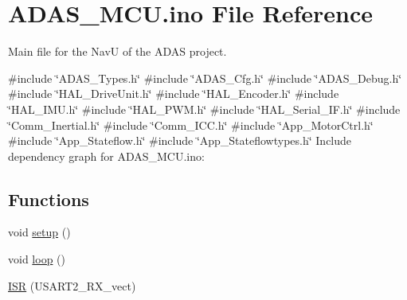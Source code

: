 \hypertarget{_a_d_a_s___m_c_u_8ino}{}\section{A\+D\+A\+S\+\_\+\+M\+C\+U.\+ino File Reference}
\label{_a_d_a_s___m_c_u_8ino}


Main file for the NavU of the A\+D\+AS project.  


{\ttfamily \#include \char`\"{}A\+D\+A\+S\+\_\+\+Types.\+h\char`\"{}}\newline
{\ttfamily \#include \char`\"{}A\+D\+A\+S\+\_\+\+Cfg.\+h\char`\"{}}\newline
{\ttfamily \#include \char`\"{}A\+D\+A\+S\+\_\+\+Debug.\+h\char`\"{}}\newline
{\ttfamily \#include \char`\"{}H\+A\+L\+\_\+\+Drive\+Unit.\+h\char`\"{}}\newline
{\ttfamily \#include \char`\"{}H\+A\+L\+\_\+\+Encoder.\+h\char`\"{}}\newline
{\ttfamily \#include \char`\"{}H\+A\+L\+\_\+\+I\+M\+U.\+h\char`\"{}}\newline
{\ttfamily \#include \char`\"{}H\+A\+L\+\_\+\+P\+W\+M.\+h\char`\"{}}\newline
{\ttfamily \#include \char`\"{}H\+A\+L\+\_\+\+Serial\+\_\+\+I\+F.\+h\char`\"{}}\newline
{\ttfamily \#include \char`\"{}Comm\+\_\+\+Inertial.\+h\char`\"{}}\newline
{\ttfamily \#include \char`\"{}Comm\+\_\+\+I\+C\+C.\+h\char`\"{}}\newline
{\ttfamily \#include \char`\"{}App\+\_\+\+Motor\+Ctrl.\+h\char`\"{}}\newline
{\ttfamily \#include \char`\"{}App\+\_\+\+Stateflow.\+h\char`\"{}}\newline
{\ttfamily \#include \char`\"{}App\+\_\+\+Stateflowtypes.\+h\char`\"{}}\newline
Include dependency graph for A\+D\+A\+S\+\_\+\+M\+C\+U.\+ino\+:
\subsection*{Functions}
\begin{DoxyCompactItemize}
\item 
void \mbox{\hyperlink{_a_d_a_s___m_c_u_8ino_a4fc01d736fe50cf5b977f755b675f11d}{setup}} ()
\item 
void \mbox{\hyperlink{_a_d_a_s___m_c_u_8ino_afe461d27b9c48d5921c00d521181f12f}{loop}} ()
\item 
\mbox{\hyperlink{_a_d_a_s___m_c_u_8ino_a63a86aad9ba2e355fe6380da553f554e}{I\+SR}} (U\+S\+A\+R\+T2\+\_\+\+R\+X\+\_\+vect)
\end{DoxyCompactItemize}

